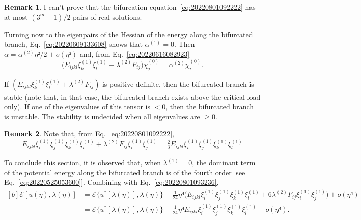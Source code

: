 \documentclass[12pt, final]{scrartcl}
\theoremstyle{definition}
\newtheorem{remark}{Remark}
\newcommand{\E}{\mathcal E}
\newcommand{\order}[2][1]{#2^{(#1)}}
\begin{document}
\begin{remark}
  I can't prove that the bifurcation equation~\eqref{eq:20220801092222} has at
  most $(3^m - 1) / 2$ pairs of real solutions.
\end{remark}

Turning now to the eigenpairs of the Hessian of the energy along
the bifurcated branch, Eq.~\eqref{eq:20220609133608} shows that $\order[1]α = 0$. Then
$α = \order[2]α η² / 2 + o(η²)$ and, from Eq.~\eqref{eq:20220616082923}
\begin{equation}
  \bigl(E_{ijkl} \order[1]{ξ_k} \order[1]{ξ_l} + \order[2]\lambda F_{ij} \bigr) \order[0]{χ_j} = \order[2]α \order[0]{χ_i}.
\end{equation}

If $(E_{ijkl} \order[1]{ξ_k} \order[1]{ξ_l} + \order[2]\lambda F_{ij} )$ is positive definite, then the
bifurcated branch is stable (note that, in that case, the bifurcated branch
exists above the critical load only). If one of the eigenvalues of this tensor
is $<0$, then the bifurcated branch is unstable. The stability is undecided
when all eigenvalues are $≥ 0$.

\begin{remark}
  Note that, from Eq.~\eqref{eq:20220801092222},
  \begin{equation}
    E_{ijkl} \order[1]{ξ_i} \order[1]{ξ_j} \order[1]{ξ_k} \order[1]{ξ_l} + \order[2]\lambda F_{ij} \order[1]{ξ_i} \order[1]{ξ_j} = \tfrac{2}{3} E_{ijkl} \order[1]{ξ_i} \order[1]{ξ_j} \order[1]{ξ_k} \order[1]{ξ_l}
  \end{equation}

\end{remark}

To conclude this section, it is observed that, when $\order[1]\lambda = 0$, the dominant
term of the potential energy along the bifurcated branch is of the fourth order
[see Eq.~\eqref{eq:20220525053600}]. Combining with Eq.~\eqref{eq:20220801093236},
\begin{equation}
  \label{eq:20220801094437}
  \begin{aligned}[b]
    \E[u(η), \lambda(η)]
    &= \E\{u^{\ast}[\lambda(η)], \lambda(η)\} + \tfrac{1}{24} η⁴ \bigl(E_{ijkl} \order[1]{ξ_i} \order[1]{ξ_j} \order[1]{ξ_k} \order[1]{ξ_l}  + 6  \order[2]\lambda F_{ij} \order[1]{ξ_i} \order[1]{ξ_j}\bigr) + o(η⁴)\\
    &= \E\{u^{\ast}[\lambda(η)], \lambda(η)\} - \tfrac{1}{24} η⁴ E_{ijkl} \order[1]{ξ_i} \order[1]{ξ_j} \order[1]{ξ_k} \order[1]{ξ_l} + o(η⁴).
  \end{aligned}
\end{equation}
\end{document}
